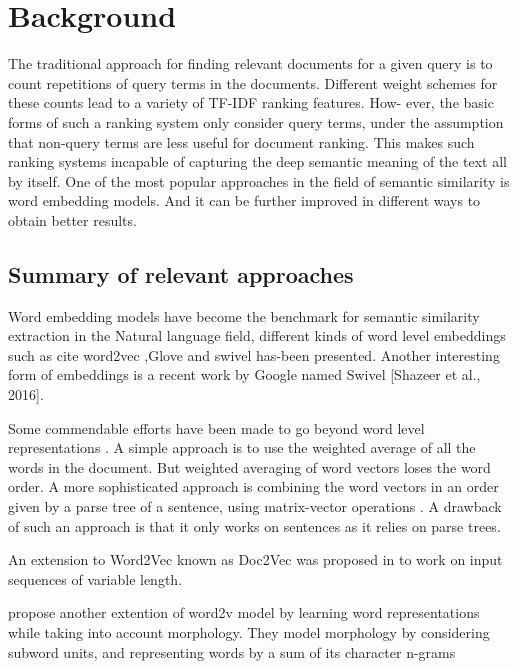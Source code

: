 \chapter{Background} 
\label{chapter:background}
The traditional approach for finding relevant documents for a given query
is to count repetitions of query terms in the documents. Different weight
schemes for these counts lead to a variety of TF-IDF ranking features. How-
ever, the basic forms of such a ranking system only consider query terms,
under the assumption that non-query terms are less useful for document
ranking. This makes such ranking systems incapable of capturing the deep
semantic meaning of the text all by itself. One of the most popular 
approaches in the field of semantic similarity is word embedding models. And it can be further 
improved in different ways to obtain better results.

\section{Summary of relevant approaches}

Word embedding models have become the benchmark for semantic similarity extraction in the Natural language field, different kinds of word level embeddings such as {cite word2vec} ,{Glove} and {swivel} has-been presented. Another interesting form of
embeddings is a recent work by Google named Swivel [Shazeer et al., 2016].

Some commendable efforts have been made to go beyond word level representations  \cite{mitchell2010composition}  \cite{zanzotto2010estimating} 
\cite{yessenalina2011compositional}  \cite{grefenstette2013multi}  \cite{mikolov2013distributed}. A simple approach is to use the weighted average of all the words in the document. But weighted averaging of word vectors loses the word order. A more sophisticated approach is combining the word vectors
in an order given by a parse tree of a sentence, using
matrix-vector operations \cite{socher2011dynamic}. A drawback of such an approach is that it only works on sentences as it relies on parse trees.

An extension to Word2Vec known as Doc2Vec was proposed in \cite{le2014distributed} to work on input sequences of
variable length.

 \cite{bojanowski2016enriching} propose another extention of word2v model by learning word
 representations while taking into account morphology.
 They model morphology by considering subword
 units, and representing words by a sum of its character
 n-grams

